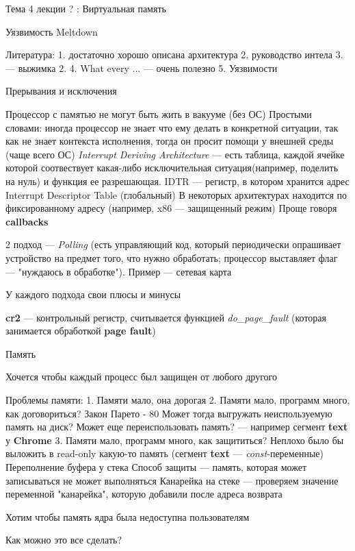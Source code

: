 Тема 4 лекции ? : Виртуальная память

Уязвимость Meltdown

Литература:
1. достаточно хорошо описана архитектура
2. руководство интела
3. --- выжимка 2.
4. What every ... --- очень полезно
5. Уязвимости

Прерывания и исключения

Процессор с памятью не могут быть жить в вакууме (без ОС)
Простыми словами: иногда процессор не знает что ему делать в конкретной ситуации,
так как не знает контекста исполнения, тогда он просит помощи у внешней среды (чаще всего ОС)
\emph{Interrupt Deriving Architecture} --- есть таблица, каждой ячейке которой соотвествует какая-либо
исключительная ситуация(например, поделить на нуль) и функция ее разрешающая.
IDTR --- регистр, в котором хранится адрес Interrupt Descriptor Table (глобальный)
В некоторых архитектурах находится по фиксированному адресу (например, x86 --- защищенный режим)
Проще говоря \textbf{callbacks}

2 подход --- \emph{Polling} (есть управляющий код, который периодически опрашивает устройство на предмет того,
что нужно обработать; процессор выставляет флаг --- "нуждаюсь в обработке"). Пример --- сетевая карта

У каждого подхода свои плюсы и минусы

\textbf{cr2} --- контрольный регистр, считывается функцией \emph{do_page_fault} 
(которая занимается обработкой \textbf{page fault})


Память

Хочется чтобы каждый процесс был защищен от любого другого

Проблемы памяти:
1. Памяти мало, она дорогая
2. Памяти мало, программ много, как договориться?
    Закон Парето - 80%
    Может тогда выгружать неиспользуемую память на диск?
    Может еще переиспользовать память? --- например сегмент \textbf{text} у \textbf{Chrome}
3. Памяти мало, программ много, как защититься?
    Неплохо было бы выложить в read-only какую-то память (сегмент \textbf{text} --- \emph{const}-переменные)
    Переполнение буфера у стека
    Способ защиты --- память, которая может записываться не может выполняться
    Канарейка на стеке --- проверяем значение переменной "канарейка", которую добавили после адреса возврата

    Хотим чтобы память ядра была недоступна пользователям

Как можно это все сделать?

